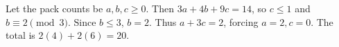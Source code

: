 Let the pack counts be $a,b,c\ge0$. Then $3a+4b+9c=14$, so $c\le1$ and $b\equiv2\pmod3$. Since $b\le3$, $b=2$. Thus $a+3c=2$, forcing $a=2,c=0$. The total is $2(4)+2(6)=\boxed{20}$.
